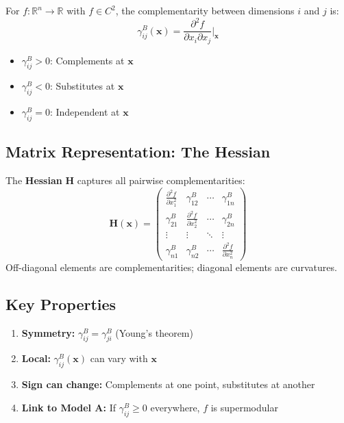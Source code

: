 \begin{definition}
For $f: \mathbb{R}^n \to \mathbb{R}$ with $f \in C^2$, the complementarity between dimensions $i$ and $j$ is:
\begin{equation}
\gamma^B_{ij}(\mathbf{x}) = \frac{\partial^2 f}{\partial x_i \partial x_j}\bigg|_{\mathbf{x}}
\label{eq:model-b}
\end{equation}
\begin{itemize}
    \item $\gamma^B_{ij} > 0$: Complements at $\mathbf{x}$
    \item $\gamma^B_{ij} < 0$: Substitutes at $\mathbf{x}$
    \item $\gamma^B_{ij} = 0$: Independent at $\mathbf{x}$
\end{itemize}
\end{definition}

\subsection{Matrix Representation: The Hessian}

\begin{definition}
The \textbf{Hessian} $\mathbf{H}$ captures all pairwise complementarities:
\begin{equation}
\mathbf{H}(\mathbf{x}) = \begin{pmatrix}
\frac{\partial^2 f}{\partial x_1^2} & \gamma^B_{12} & \cdots & \gamma^B_{1n} \\
\gamma^B_{21} & \frac{\partial^2 f}{\partial x_2^2} & \cdots & \gamma^B_{2n} \\
\vdots & \vdots & \ddots & \vdots \\
\gamma^B_{n1} & \gamma^B_{n2} & \cdots & \frac{\partial^2 f}{\partial x_n^2}
\end{pmatrix}
\end{equation}
Off-diagonal elements are complementarities; diagonal elements are curvatures.
\end{definition}

\subsection{Key Properties}

\begin{theorem}
\begin{enumerate}
    \item \textbf{Symmetry:} $\gamma^B_{ij} = \gamma^B_{ji}$ (Young's theorem)
    \item \textbf{Local:} $\gamma^B_{ij}(\mathbf{x})$ can vary with $\mathbf{x}$
    \item \textbf{Sign can change:} Complements at one point, substitutes at another
    \item \textbf{Link to Model A:} If $\gamma^B_{ij} \geq 0$ everywhere, $f$ is supermodular
\end{enumerate}
\end{theorem}

